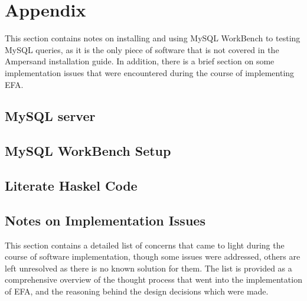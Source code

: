 \section*{Appendix}
This section contains notes on installing and using MySQL WorkBench to testing 
MySQL queries, as it is the only piece of software that is not covered in the 
Ampersand installation guide. In addition, there is a brief section on some 
implementation issues that were encountered during the course of implementing 
EFA.
\subsection*{MySQL server}\label{appen:SQL}

\subsection*{MySQL WorkBench Setup}\label{appen:WorkBench}

\subsection*{Literate Haskel Code}
%
\subsection*{Notes on Implementation Issues}

This section contains a detailed list of concerns that came to light during the 
course of software implementation, though some issues were addressed, others 
are left unresolved as there is no known solution for them. The list is 
provided as a comprehensive overview of the thought process that went into the 
implementation of EFA, and the reasoning behind the design decisions which were 
made.

